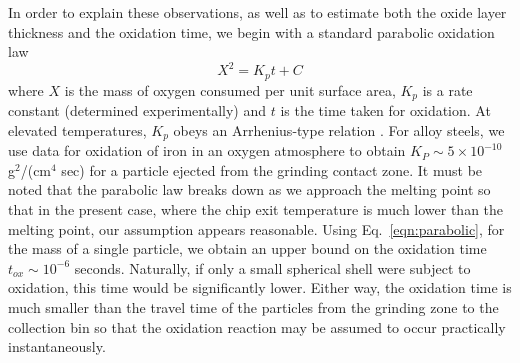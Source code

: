 \documentclass[11pt]{article}
\begin{document}
In order to explain these observations, as well as to estimate both the oxide layer thickness and the oxidation time, we begin with a standard parabolic oxidation law \cite{pilling1923oxidation, cabrera1949theory}
\begin{equation}
  \label{eqn:parabolic}
  X^2=K_{p} t +C
\end{equation}
where $X$ is the mass of oxygen consumed per unit surface area, $K_{p}$ is a rate constant (determined experimentally) and $t$ is the time taken for oxidation. At elevated temperatures, $K_p$ obeys an Arrhenius-type relation \cite{campbell1947oxidation}. For alloy steels, we use data for oxidation of iron in an oxygen atmosphere \cite{smeltzer1960kinetics, davies1951mt} to obtain $K_P \sim 5\times 10^{-10}$ g$^2$/(cm$^4$ sec) for a particle ejected from the grinding contact zone. It must be noted that the parabolic law breaks down as we approach the melting point \cite{moulin1980influence} so that in the present case, where the chip exit temperature is much lower than the melting point, our assumption appears reasonable. Using Eq.~\ref{eqn:parabolic}, for the mass of a single particle, we obtain an upper bound on the oxidation time $t_{ox} \sim 10^{-6}$ seconds. Naturally, if only a small spherical shell were subject to oxidation, this time would be significantly lower. Either way, the oxidation time is much smaller than the travel time of the particles from the grinding zone to the collection bin so that the oxidation reaction may be assumed to occur practically instantaneously.
\end{document}
